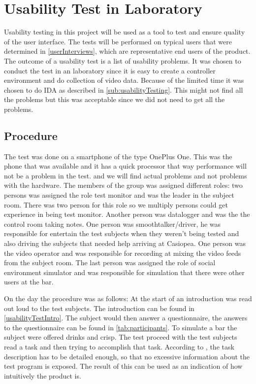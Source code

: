 \section{Usability Test in Laboratory}
Usability testing in this project will be used as a tool to test and ensure quality of the user interface. The tests will be performed on typical users that were determined in \cref{userInterviews}, which are representative end users of the product. The outcome of a usability test is a list of usability problems. It was chosen to conduct the test in an laboratory since it is easy to create a controller environment and do collection of video data. Because of the limited time it was chosen to do IDA as described in \cref{sub:usabilityTesting}. This might not find all the problems but this was acceptable since we did not need to get all the problems. 

\subsection{Procedure}
The test was done on a smartphone of the type OnePlus One. This was the phone that was available and it has a quick processor that way performance will not be a problem in the test. and we will find actual problems and not problems with the hardware. The members of the group was assigned different roles: two persons was assigned the role test monitor and was the leader in the subject room. There was two person for this role so we multiply persons could get experience in being test monitor. Another person was datalogger and was the the control room taking notes. One person was smoothtalker/driver, he was responsible for entertain the test subjects when they weren't being tested and also driving the subjects that needed help arriving at Casiopea. One person was the video operator and was responsible for recording at mixing the video feeds from the subject room. The last person was assigned the role of social environment simulator and was responsible for simulation that there were other users at the bar.

On the day the procedure was as follows: At the start of an introduction was read out loud to the test subjects. The introduction can be found in \cref{usabilityTestIntro}. The subject would then answer a questionnaire, the answers to the questionnaire can be found in \cref{tab:participants}. To simulate a bar the subject were offered drinks and crisp. The test proceed with the test subjects read a task and then trying to accomplish that task. According to \cite{RubinChisnellSpool08}, the task description has to be detailed enough, so that no excessive information about the test program is exposed. The result of this can be used as an indication of how intuitively the product is.

